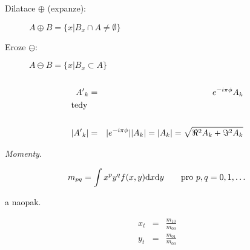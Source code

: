 



\begin{description}
\item[Dilatace $\oplus$ (expanze):] $A\oplus B=\{x|B_x\cap A\neq \emptyset\}$
\item[Eroze $\ominus$:] $A\ominus B=\{x|B_x\subset A\}$
\end{description}


\begin{equation}
\end{equation}

\begin{description}
\end{description}

\begin{description}
\end{description}

\def\R{\mathbf{R}}

\begin{description}
\end{description}

\begin{itemize}
\end{itemize}






\begin{eqnarray}
{A'}_k&=&e^{-i\pi\phi}A_k\\
\noalign{\hbox{tedy}\nonumber}\\
|{A'}_k|&=&|e^{-i\pi\phi}||A_k|=|A_k|=\sqrt{\Re^2A_k+\Im^2A_k}
\end{eqnarray}

\begin{itemize}
\end{itemize}








{\em Momenty}.

\def\d{{\rm d}}
\begin{equation}
m_{pq}=\int x^py^qf(x,y)\d x\d y\qquad \hbox{pro $p,q=0,1,\dots$}
\end{equation}

a naopak.

\begin{eqnarray}
x_t&=&\frac{m_{10}}{m_{00}}\nonumber\\
y_t&=&\frac{m_{01}}{m_{00}}
\end{eqnarray}


